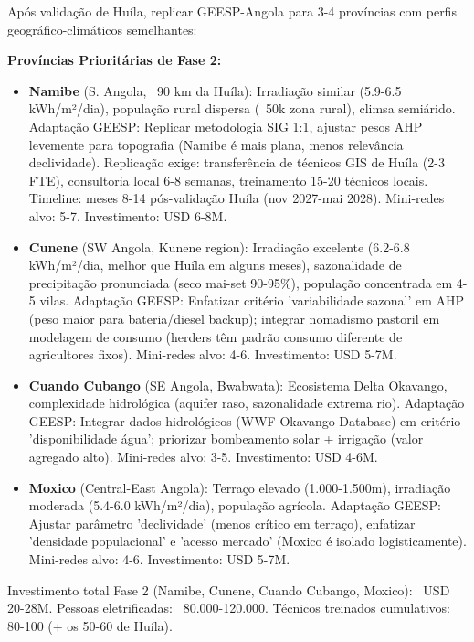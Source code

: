 \documentclass[12pt, a4paper]{article}
\begin{document}
Após validação de Huíla, replicar GEESP-Angola para 3-4 províncias com perfis geográfico-climáticos semelhantes:

\textbf{Províncias Prioritárias de Fase 2:}
\begin{itemize}
\item \textbf{Namibe} (S. Angola, ~90 km da Huíla): Irradiação similar (5.9-6.5 kWh/m²/dia), população rural dispersa (~50k zona rural), climsa semiárido. Adaptação GEESP: Replicar metodologia SIG 1:1, ajustar pesos AHP levemente para topografia (Namibe é mais plana, menos relevância declividade). Replicação exige: transferência de técnicos GIS de Huíla (2-3 FTE), consultoria local 6-8 semanas, treinamento 15-20 técnicos locais. Timeline: meses 8-14 pós-validação Huíla (nov 2027-mai 2028). Mini-redes alvo: 5-7. Investimento: USD 6-8M.

\item \textbf{Cunene} (SW Angola, Kunene region): Irradiação excelente (6.2-6.8 kWh/m²/dia, melhor que Huíla em alguns meses), sazonalidade de precipitação pronunciada (seco mai-set 90-95\%), população concentrada em 4-5 vilas. Adaptação GEESP: Enfatizar critério 'variabilidade sazonal' em AHP (peso maior para bateria/diesel backup); integrar nomadismo pastoril em modelagem de consumo (herders têm padrão consumo diferente de agricultores fixos). Mini-redes alvo: 4-6. Investimento: USD 5-7M.

\item \textbf{Cuando Cubango} (SE Angola, Bwabwata): Ecosistema Delta Okavango, complexidade hidrológica (aquifer raso, sazonalidade extrema rio). Adaptação GEESP: Integrar dados hidrológicos (WWF Okavango Database) em critério 'disponibilidade água'; priorizar bombeamento solar + irrigação (valor agregado alto). Mini-redes alvo: 3-5. Investimento: USD 4-6M.

\item \textbf{Moxico} (Central-East Angola): Terraço elevado (1.000-1.500m), irradiação moderada (5.4-6.0 kWh/m²/dia), população agrícola. Adaptação GEESP: Ajustar parâmetro 'declividade' (menos crítico em terraço), enfatizar 'densidade populacional' e 'acesso mercado' (Moxico é isolado logisticamente). Mini-redes alvo: 4-6. Investimento: USD 5-7M.
\end{itemize}

Investimento total Fase 2 (Namibe, Cunene, Cuando Cubango, Moxico): ~USD 20-28M. Pessoas eletrificadas: ~80.000-120.000. Técnicos treinados cumulativos: 80-100 (+ os 50-60 de Huíla).
\end{document}
